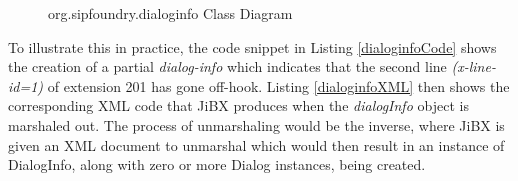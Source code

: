 \documentclass[twoside,11pt]{article}
\begin{document}
\begin{figure}[ht] \centering
{}
\caption{org.sipfoundry.dialoginfo Class Diagram}
\label{dialoginfoDiagram}
\end{figure}

To illustrate this in practice, the code snippet in Listing \ref{dialoginfoCode} shows the creation
of a partial \emph{dialog-info} which indicates that the second line
\emph{(x-line-id=1)} of extension 201 has gone off-hook.  Listing \ref{dialoginfoXML} then shows the corresponding XML code
that JiBX produces when the \emph{dialogInfo} object is marshaled out.  The process of unmarshaling
would be the inverse, where JiBX is given an XML document to unmarshal which would then result in an
instance of DialogInfo, along with zero or more Dialog instances, being created.
\end{document}
